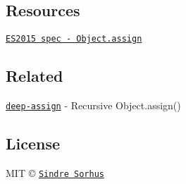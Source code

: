 \subsection*{Resources}


\begin{DoxyItemize}
\item \href{https://people.mozilla.org/~jorendorff/es6-draft.html#sec-object.assign}{\tt E\+S2015 spec -\/ Object.\+assign}
\end{DoxyItemize}

\subsection*{Related}


\begin{DoxyItemize}
\item \href{https://github.com/sindresorhus/deep-assign}{\tt deep-\/assign} -\/ Recursive {\ttfamily Object.\+assign()}
\end{DoxyItemize}

\subsection*{License}

M\+IT © \href{https://sindresorhus.com}{\tt Sindre Sorhus} 